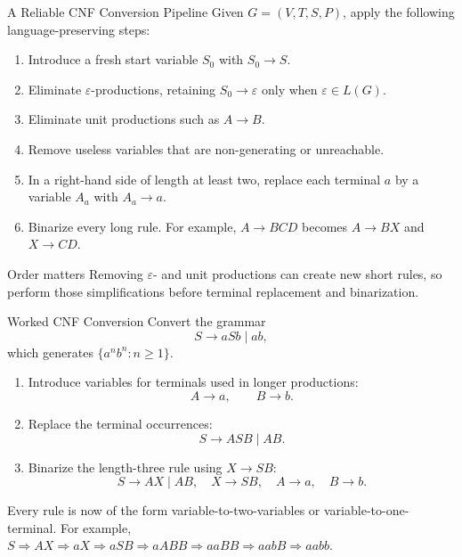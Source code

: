 \documentclass[10pt]{beamer}
\begin{document}
\begin{frame}{A Reliable CNF Conversion Pipeline}
  \small
  Given $G=(V,T,S,P)$, apply the following language-preserving steps:
  \begin{enumerate}
    \item Introduce a fresh start variable $S_0$ with $S_0\to S$.
    \item Eliminate $\varepsilon$-productions, retaining
      $S_0\to\varepsilon$ only when $\varepsilon\in L(G)$.
    \item Eliminate unit productions such as $A\to B$.
    \item Remove useless variables that are non-generating or unreachable.
    \item In a right-hand side of length at least two, replace each terminal
      $a$ by a variable $A_a$ with $A_a\to a$.
    \item Binarize every long rule. For example,
      $A\to BCD$ becomes $A\to BX$ and $X\to CD$.
  \end{enumerate}
  \pause
  \begin{alertblock}{Order matters}
    Removing $\varepsilon$- and unit productions can create new short rules,
    so perform those simplifications before terminal replacement and
    binarization.
  \end{alertblock}
\end{frame}

\begin{frame}{Worked CNF Conversion}
  \small
  Convert the grammar
  \[
    S\to aSb\mid ab,
  \]
  which generates $\{a^n b^n:n\ge1\}$.
  \begin{enumerate}
    \item Introduce variables for terminals used in longer productions:
      \[
        A\to a,\qquad B\to b.
      \]
    \item Replace the terminal occurrences:
      \[
        S\to ASB\mid AB.
      \]
    \item Binarize the length-three rule using $X\to SB$:
      \[
        \boxed{S\to AX\mid AB,\quad X\to SB,\quad A\to a,\quad B\to b.}
      \]
  \end{enumerate}
  Every rule is now of the form variable-to-two-variables or
  variable-to-one-terminal. For example,
  $S\Rightarrow AX\Rightarrow aX\Rightarrow aSB\Rightarrow aABB
  \Rightarrow aaBB\Rightarrow aabB\Rightarrow aabb$.
\end{frame}
\end{document}
